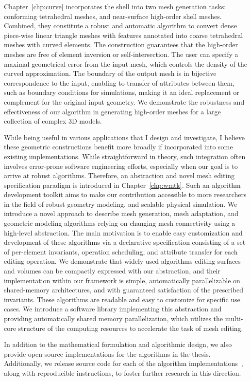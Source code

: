%

Chapter~\ref*{chp:curve} incorporates the shell into two mesh generation tasks: conforming tetrahedral meshes, and near-surface high-order shell meshes. Combined, they constitute a robust and automatic algorithm to convert dense piece-wise linear triangle meshes with features annotated into coarse tetrahedral meshes with curved elements. The construction guarantees that the high-order meshes are free of element inversion or self-intersection. 
The user can specify a maximal geometrical error from the input mesh, which controls the density of the curved approximation. The boundary of the output mesh is in bijective correspondence to the input, enabling to transfer of attributes between them, such as boundary conditions for simulations, making it an ideal replacement or complement for the original input geometry. We demonstrate the robustness and effectiveness of our algorithm in generating high-order meshes for a large collection of complex 3D models.

While being useful in various applications that I design and investigate, I believe these geometric constructions benefit more broadly if incorporated into some existing implementations. While straightforward in theory, such integration often involves error-prone software engineering efforts, especially when our goal is to arrive at robust algorithms. Therefore, an abstraction and novel mesh editing specification paradigm is introduced in Chapter~\ref*{chp:wmtk}. Such an algorithm development toolkit aims to make our contribution accessible to more researchers in the field of robust geometry modeling, and scalable physical simulation.
We introduce a novel approach to describe mesh generation, mesh adaptation, and geometric modeling algorithms relying on changing mesh connectivity using a high-level abstraction. The main motivation is to enable easy customization and development of these algorithms via a declarative specification consisting of a set of per-element invariants, operation scheduling, and attribute transfer for each editing operation.
We demonstrate that widely used algorithms editing surfaces and volumes can be compactly expressed with our abstraction, and their implementation within our framework is simple, automatically parallelizable on shared-memory architectures, and with guaranteed satisfaction of the prescribed invariants. These algorithms are readable and easy to customize for specific use cases.
We introduce a software library implementing this abstraction and providing automatically shared memory parallelization, which utilizes the multi-core structure of the computing resources to accelerate the task of mesh editing.

In addition to the mathematical formulation and algorithmic design, we also provide open-source implementations for the algorithms in the thesis.
Additionally, we release source code for each of the algorithm implementations~\cite{githubScaffoldMap,githubshell,githubbichon}, along with reproducible instructions, to foster further research in this direction.
